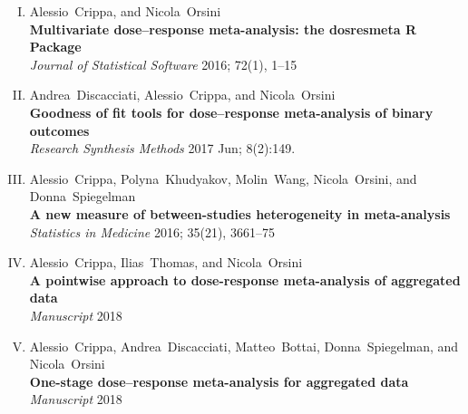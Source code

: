 \documentclass[11pt,a4paper,twoside,openany]{book}\usepackage{knitr}
\begin{document}
{{\begin{enumerate}[I.]
\item Alessio~Crippa, and Nicola~Orsini \\ \textbf{Multivariate dose--response meta-analysis: the dosresmeta R Package} \\ \textit{Journal of Statistical Software} 2016; 72(1), 1--15
\item Andrea~Discacciati, Alessio~Crippa, and Nicola~Orsini \\ \textbf{Goodness of fit tools for dose--response meta-analysis of binary outcomes} \\ \textit{Research Synthesis Methods} 2017 Jun; 8(2):149.
\item Alessio~Crippa, Polyna~Khudyakov, Molin~Wang, Nicola~Orsini, and Donna~Spiegelman \\ \textbf{A new measure of between-studies heterogeneity in meta-analysis} \\ \textit{Statistics in Medicine} 2016; 35(21), 3661--75
\item Alessio~Crippa, Ilias~Thomas, and Nicola~Orsini \\ \textbf{A pointwise approach to dose-response meta-analysis of aggregated data} \\ \textit{Manuscript} 2018
\item Alessio~Crippa, Andrea~Discacciati, Matteo~Bottai, Donna~Spiegelman, and Nicola~Orsini \\ \textbf{One-stage dose--response meta-analysis for aggregated data} \\ \textit{Manuscript} 2018
\end{enumerate}
\vspace{1.5cm}

}}
\end{document}
